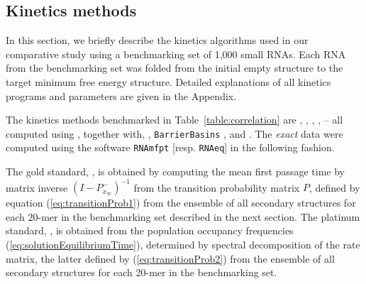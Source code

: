 \subsection{Kinetics methods}

In this section, we briefly describe the kinetics algorithms used in our
comparative study using a benchmarking set of 1,000 small RNAs. Each RNA from
the benchmarking set was folded from the initial empty structure to the
target minimum free energy structure.  Detailed
explanations of all kinetics programs and parameters are given
in the Appendix.

The kinetics methods benchmarked in Table~\ref{table:correlation}
are \rnamfpt,
\rnaeq,
\fftmfpt,
\fftbor,
\ffteq -- all computed using \hermes, together with,
\kinfold \cite{flammHofacker},
{\tt BarrierBasins} \cite{wolfingerStadler:kinetics},
and \rnatwofold \cite{hofacker:RNAbor2D}. The {\em exact} data  were computed using the \hermes software {\tt RNAmfpt}
[resp. {\tt RNAeq}] in the following fashion.

The gold standard, \rnamfpt, is obtained by computing the
mean first passage time by matrix inverse $(I - P^{-}_{x_{\infty}})^{-1}$
from the transition probability matrix $P$, defined by equation
(\ref{eq:transitionProb1}) from the ensemble of all secondary structures
for each 20-mer in the benchmarking set described in the next section.
The platinum standard, \rnaeq, is obtained from the
population occupancy frequencies
(\ref{eq:solutionEquilibriumTime}), determined by spectral decomposition
of the rate matrix, the latter defined by
(\ref{eq:transitionProb2}) from the ensemble of all secondary structures
for each 20-mer in the benchmarking set.


